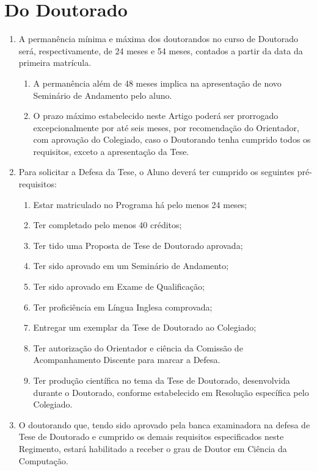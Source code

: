 \documentclass{article}
\newcommand{\grupoMenor}{Colegiado\xspace}
\begin{document}
\section{Do Doutorado}
\begin{enumerate}
	\item  A permanência mínima e máxima dos doutorandos no curso de Doutorado será, respectivamente, de 24 meses e 54 meses, contados a partir da data da primeira matrícula.
	\begin{enumerate}
		\item A permanência além de 48 meses implica na apresentação de novo Seminário de Andamento pelo aluno.	
		\item O prazo máximo estabelecido neste Artigo poderá ser prorrogado excepcionalmente por até seis meses, por recomendação do Orientador, com aprovação do \grupoMenor, caso o Doutorando tenha cumprido todos os requisitos, exceto a apresentação da Tese.
	\end{enumerate}
	
	\item Para solicitar a Defesa da Tese, o Aluno deverá ter cumprido os seguintes pré-requisitos:
	\begin{enumerate}[label=\Roman*]
		\item	Estar matriculado no Programa há pelo menos 24 meses;
		\item	Ter completado pelo menos 40 créditos;
		\item	Ter tido uma Proposta de Tese de Doutorado aprovada;
		\item	Ter sido aprovado em um Seminário de Andamento;
		\item	Ter sido aprovado em Exame de Qualificação;
		\item 	Ter proficiência em Língua Inglesa comprovada;
		\item	Entregar um exemplar da Tese de Doutorado ao \grupoMenor;
		\item	Ter autorização do Orientador e ciência da Comissão de Acompanhamento Discente para marcar a Defesa.
		\item	Ter produção científica no tema da Tese de Doutorado, desenvolvida durante o Doutorado, conforme estabelecido em Resolução específica pelo \grupoMenor.
	\end{enumerate}

	\item  O doutorando que, tendo sido aprovado pela banca examinadora na defesa de Tese de Doutorado e cumprido os demais requisitos especificados neste Regimento, estará habilitado a receber o grau de Doutor em Ciência da Computação.
\end{enumerate}
\end{document}
